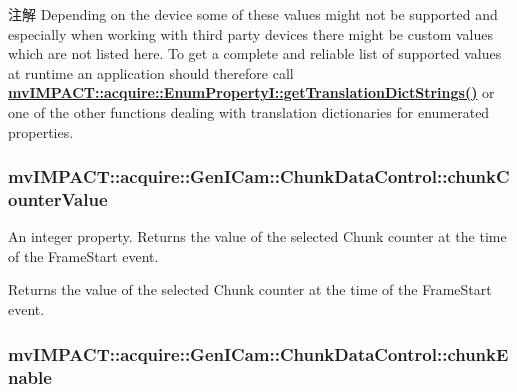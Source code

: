 \begin{DoxyNote}{注解}
Depending on the device some of these values might not be supported and especially when working with third party devices there might be custom values which are not listed here. To get a complete and reliable list of supported values at runtime an application should therefore call {\bfseries \hyperlink{classmv_i_m_p_a_c_t_1_1acquire_1_1_enum_property_i_a0ba6ccbf5ee69784d5d0b537924d26b6}{mv\+I\+M\+P\+A\+C\+T\+::acquire\+::\+Enum\+Property\+I\+::get\+Translation\+Dict\+Strings()}} or one of the other functions dealing with translation dictionaries for enumerated properties. 
\end{DoxyNote}
\hypertarget{classmv_i_m_p_a_c_t_1_1acquire_1_1_gen_i_cam_1_1_chunk_data_control_a21793d389f9c7b12053027e6cef91520}{
\subsubsection[{chunk\+Counter\+Value}]{ mv\+I\+M\+P\+A\+C\+T\+::acquire\+::\+Gen\+I\+Cam\+::\+Chunk\+Data\+Control\+::chunk\+Counter\+Value}}\label{classmv_i_m_p_a_c_t_1_1acquire_1_1_gen_i_cam_1_1_chunk_data_control_a21793d389f9c7b12053027e6cef91520}


An integer property. Returns the value of the selected Chunk counter at the time of the Frame\+Start event. 

Returns the value of the selected Chunk counter at the time of the Frame\+Start event. \hypertarget{classmv_i_m_p_a_c_t_1_1acquire_1_1_gen_i_cam_1_1_chunk_data_control_ae4448c564c23ae14648a81c74fdd2f6f}{
\subsubsection[{chunk\+Enable}]{ mv\+I\+M\+P\+A\+C\+T\+::acquire\+::\+Gen\+I\+Cam\+::\+Chunk\+Data\+Control\+::chunk\+Enable}}\label{classmv_i_m_p_a_c_t_1_1acquire_1_1_gen_i_cam_1_1_chunk_data_control_ae4448c564c23ae14648a81c74fdd2f6f}


